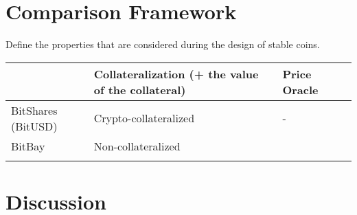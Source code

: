 \section{Comparison Framework} %
Define the properties that are considered during the design of stable coins.
~
\begin{table}[]
	\begin{tabular}{|l|l|l|l|}
		\hline
		& Collateralization (+ the value of the collateral) & Price Oracle   \\ \hline
		BitShares (BitUSD) &  Crypto-collateralized &  -  \\ \hline
		BitBay & Non-collateralized &   \\ \hline
		 &   &   \\ \hline
	\end{tabular}
\end{table}

\section{Discussion}


